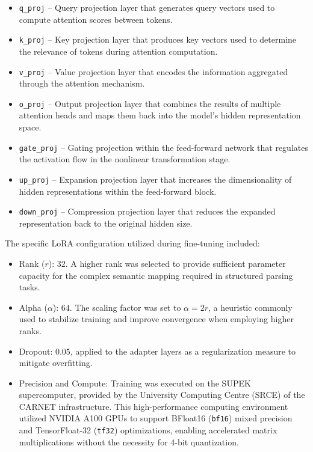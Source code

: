\documentclass[journal,article,submit,pdftex,moreauthors]{Definitions/mdpi}
\begin{document}
\begin{itemize}
    \item \texttt{q\_proj} – Query projection layer that generates query vectors used to compute attention scores between tokens.
    
    \item \texttt{k\_proj} – Key projection layer that produces key vectors used to determine the relevance of tokens during attention computation.
    
    \item \texttt{v\_proj} – Value projection layer that encodes the information aggregated through the attention mechanism.
    
    \item \texttt{o\_proj} – Output projection layer that combines the results of multiple attention heads and maps them back into the model’s hidden representation space.
    
    \item \texttt{gate\_proj} – Gating projection within the feed-forward network that regulates the activation flow in the nonlinear transformation stage.
    
    \item \texttt{up\_proj} – Expansion projection layer that increases the dimensionality of hidden representations within the feed-forward block.
    
    \item \texttt{down\_proj} – Compression projection layer that reduces the expanded representation back to the original hidden size.
\end{itemize}

The specific LoRA configuration utilized during fine-tuning included:

\begin{itemize}
    \item Rank ($r$): $32$. A higher rank was selected to provide sufficient parameter capacity for the complex semantic mapping required in structured parsing tasks.
    
    \item Alpha ($\alpha$): $64$. The scaling factor was set to $\alpha = 2r$, a heuristic commonly used to stabilize training and improve convergence when employing higher ranks.
    
    \item Dropout: $0.05$, applied to the adapter layers as a regularization measure to mitigate overfitting.
    
    \item Precision and Compute: Training was executed on the SUPEK supercomputer, provided by the University Computing Centre (SRCE) of the CARNET infrastructure. This high-performance computing environment utilized NVIDIA A100 GPUs to support BFloat16 (\texttt{bf16}) mixed precision and TensorFloat-32 (\texttt{tf32}) optimizations, enabling accelerated matrix multiplications without the necessity for 4-bit quantization.
\end{itemize}
\end{document}

